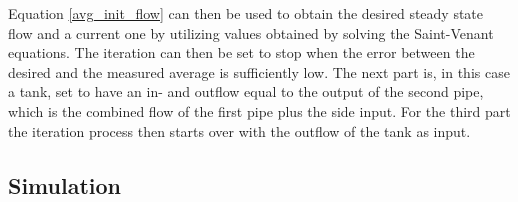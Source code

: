 Equation \ref{avg_init_flow} can then be used to obtain the desired steady state flow and a current one by utilizing values obtained by solving the Saint-Venant equations. The iteration can then be set to stop when the error between the desired and the measured average is sufficiently low. The next part is, in this case a tank, set to have an in- and outflow equal to the output of the second pipe, which is the combined flow of the first pipe plus the side input. For the third part the iteration process then starts over with the outflow of the tank as input. 

\subsection*{Simulation}







